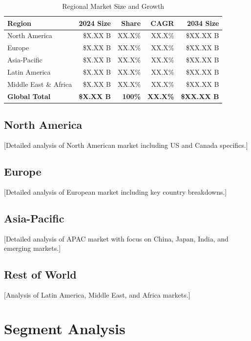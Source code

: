 \documentclass[11pt,letterpaper]{report}
\begin{document}
\begin{table}[htbp]
\centering
\caption{Regional Market Size and Growth}
\begin{tabular}{@{}lrrrr@{}}
\toprule
\textbf{Region} & \textbf{2024 Size} & \textbf{Share} & \textbf{CAGR} & \textbf{2034 Size} \\
\midrule
North America & \$X.XX B & XX.X\% & XX.X\% & \$XX.XX B \\
\rowcolor{tablealt} Europe & \$X.XX B & XX.X\% & XX.X\% & \$XX.XX B \\
Asia-Pacific & \$X.XX B & XX.X\% & XX.X\% & \$XX.XX B \\
\rowcolor{tablealt} Latin America & \$X.XX B & XX.X\% & XX.X\% & \$XX.XX B \\
Middle East \& Africa & \$X.XX B & XX.X\% & XX.X\% & \$XX.XX B \\
\midrule
\textbf{Global Total} & \textbf{\$X.XX B} & \textbf{100\%} & \textbf{XX.X\%} & \textbf{\$XX.XX B} \\
\bottomrule
\end{tabular}
\label{tab:regional_market}
\end{table}

\subsection{North America}
[Detailed analysis of North American market including US and Canada specifics.]

\subsection{Europe}
[Detailed analysis of European market including key country breakdowns.]

\subsection{Asia-Pacific}
[Detailed analysis of APAC market with focus on China, Japan, India, and emerging markets.]

\subsection{Rest of World}
[Analysis of Latin America, Middle East, and Africa markets.]

\section{Segment Analysis}
\end{document}
